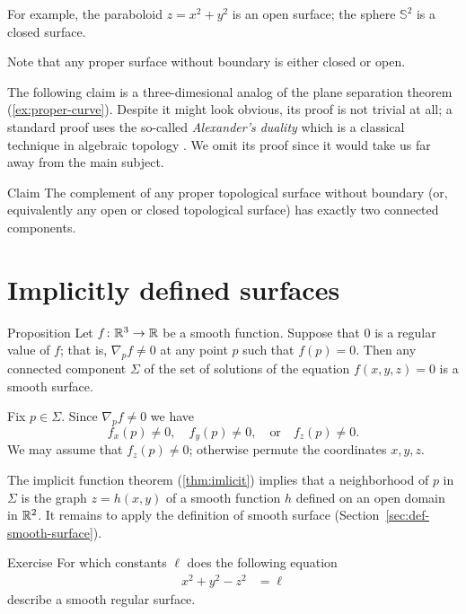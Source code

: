 For example, the paraboloid $z=x^2+y^2$
is an open surface; the 
sphere $\mathbb{S}^2$ is a closed surface.

Note that any proper surface without boundary is either closed or open.

The following claim is a three-dimesional analog of the plane separation theorem (\ref{ex:proper-curve}).
Despite it might look obvious, its proof is not trivial at all; a standard proof uses the so-called {}\emph{Alexander's duality} which is a classical technique in algebraic topology \cite[see][]{hatcher}.
We omit its proof since it would take us far away from the main subject.

\begin{thm}{Claim}\label{clm:proper-divides}
The complement of any proper topological surface without boundary (or, equivalently any open or closed topological surface) has exactly two connected components. 
\end{thm}

\section{Implicitly defined surfaces}

\begin{thm}{Proposition}\label{prop:implicit-surface}
Let $f\colon\mathbb{R}^3\to \mathbb{R}$ be a smooth function.
Suppose that $0$ is a regular value of $f$;
that is, $\nabla_p f\ne 0$ at any point $p$ such that $f(p)=0$.
Then any connected component $\Sigma$ of the set of solutions of the equation $f(x,y,z)=0$ is a smooth surface.
\end{thm}

Fix $p\in\Sigma$.
Since $\nabla_p f\ne 0$ we have 
\[f_x(p)\ne 0,\quad f_y(p)\ne 0,\quad \text{or}\quad f_z(p)\ne 0.\]
We may assume that $f_z(p)\ne 0$;
otherwise permute the coordinates $x,y,z$.

The implicit function theorem (\ref{thm:imlicit}) implies that a neighborhood of $p$ in $\Sigma$ is the graph $z=h(x,y)$ of a smooth function $h$ defined on an open domain in $\mathbb{R}^2$.
It remains to apply the definition of smooth surface (Section~\ref{sec:def-smooth-surface}).
\qeds

\begin{thm}{Exercise}\label{ex:hyperboloinds}
For which constants $\ell$ 
does the following equation
\begin{align*}
x^2+y^2-z^2&=\ell
\end{align*}
describe a smooth regular surface.
\end{thm}

